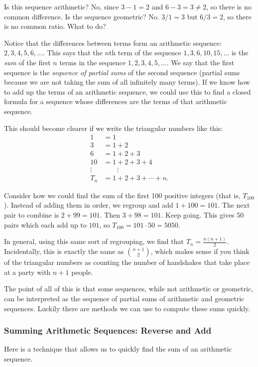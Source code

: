 \documentclass[12pt]{article}
\begin{document}

Is this sequence arithmetic?  No, since $3-1 = 2$ and $6-3 = 3 \ne 2$, so there is no common difference.  Is the sequence geometric?  No.  $3/1 = 3$ but $6/3 = 2$, so there is no common ratio.  What to do?

Notice that the differences between terms form an arithmetic sequence: $2, 3, 4, 5, 6,\ldots$.  This says that the $n$th term of the sequence $1,3,6,10,15,\ldots$ is the {\em sum} of the first $n$ terms in the sequence $1,2,3,4,5,\ldots$.  We say that the first sequence is the {\em sequence of partial sums} of the second sequence (partial sums because we are not taking the sum of all infinitely many terms). If we know how to add up the terms of an arithmetic sequence, we could use this to find a closed formula for a sequence whose differences are the terms of that arithmetic sequence.

This should become clearer if we write the triangular numbers like this:
\begin{align*}
1 &= 1\\
3 &= 1+2\\
6 &= 1 + 2 + 3\\
10 &= 1+2 + 3+ 4\\
\vdots & \qquad \vdots \\
T_n &= 1 + 2 + 3 + \cdots + n.
\end{align*}

Consider how we could find the sum of the first 100 positive integers (that is, $T_{100}$).  Instead of adding them in order, we regroup and add $1+100 = 101$.  The next pair to combine is $2+99 = 101$.  Then $3+98 = 101$.  Keep going.  This gives 50 pairs which each add up to $101$, so $T_{100} = 101\cdot 50 = 5050$.

In general, using this same sort of regrouping, we find that $T_n = \frac{n(n+1)}{2}$.  Incidentally, this is exactly the same as ${n+1 \choose 2}$, which makes sense if you think of the triangular numbers as counting the number of handshakes that take place at a party with $n+1$ people.

The point of all of this is that some sequences, while not arithmetic or geometric, can be interpreted as the sequence of partial sums of arithmetic and geometric sequences.  Luckily there are methods we can use to compute these sums quickly.

\subsubsection*{Summing Arithmetic Sequences: Reverse and Add}
Here is a technique that allows us to quickly find the sum of an arithmetic sequence.
\end{document}
